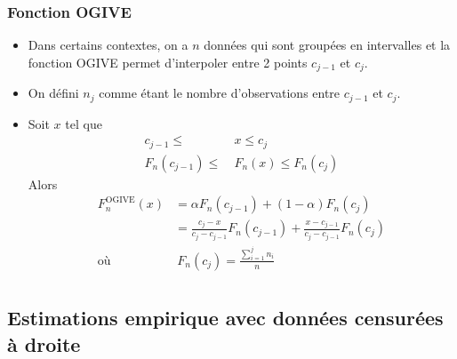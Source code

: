 \documentclass[french, landscape]{article}
\begin{document}
\begin{multicols*}{3}
\subsubsection*{Fonction OGIVE}
\begin{itemize}
    \item Dans certains contextes, on a $n$ données qui sont groupées en intervalles et la fonction OGIVE permet d'interpoler entre 2 points $c_{j - 1}$ et $c_j$.
    \item On défini $n_j$ comme étant le nombre d'observations entre $c_{j - 1}$ et $c_{j}$.
    \item Soit $x$ tel que
    \begin{align*}
    		c_{j - 1} \le &\ x \le c_j \\
    		F_{n	}(c_{j - 1}) \le &\ F_{n}(x) \le F_{n}(c_{j}) 
    \end{align*}
    Alors 
    \begin{align*}
		F_{n}^{\text{OGIVE}}(x) &= \alpha F_{n}(c_{j - 1}) + (1 - \alpha) F_{n}(c_{j}) \\
		&= \frac{c_{j} - x}{c_{j} - c_{j - 1}} F_{n}(c_{j - 1}) + \frac{x - c_{j - 1}}{c_{j} - c_{j - 1}} F_{n}(c_{j}) \\
       	\text{où } &\ F_{n}(c_j) = \frac{\sum_{i = 1}^{j} n_{i}}{n} \\
    \end{align*}
\end{itemize}

\subsection*{Estimations empirique avec données censurées à droite}


\end{multicols*}
\end{document}
